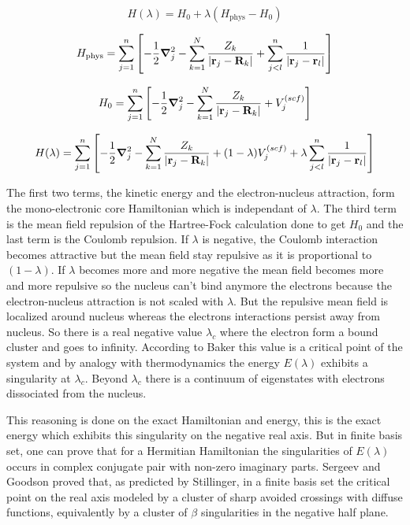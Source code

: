 \documentclass[11pt,a4paper]{article}
\begin{document}
\begin{equation}
H(\lambda)=H_0 + \lambda (H_\text{phys} - H_0)    
\end{equation}

\begin{equation}
    H_\text{phys}=\sum\limits_{j=1}^{n}\left[ -\frac{1}{2}\grad_j^2 - \sum\limits_{k=1}^{N} \frac{Z_k}{|\vb{r}_j-\vb{R}_k|}+\sum\limits_{j<l}^{n}\frac{1}{|\vb{r}_j-\vb{r}_l|}\right]
\end{equation}

\begin{equation}
    H_0=\sum\limits_{j=1}^{n}\left[ -\frac{1}{2}\grad_j^2 - \sum\limits_{k=1}^{N} \frac{Z_k}{|\vb{r}_j-\vb{R}_k|}+V_j^{(scf)}\right]
\end{equation}

\begin{equation}
    H(\lambda)=\sum\limits_{j=1}^{n}\left[-\frac{1}{2}\grad_j^2 - \sum\limits_{k=1}^{N} \frac{Z_k}{|\vb{r}_j-\vb{R}_k|} + (1-\lambda)V_j^{(scf)}+\lambda\sum\limits_{j<l}^{n}\frac{1}{|\vb{r}_j-\vb{r}_l|} \right]
\end{equation}

The first two terms, the kinetic energy and the electron-nucleus attraction, form the mono-electronic core Hamiltonian which is independant of $\lambda$. The third term is the mean field repulsion of the Hartree-Fock calculation done to get $H_0$ and the last term is the Coulomb repulsion. If $\lambda$ is negative, the Coulomb interaction becomes attractive but the mean field stay repulsive as it is proportional to $(1-\lambda)$. If $\lambda$ becomes more and more negative the mean field becomes more and more repulsive so the nucleus can't bind anymore the electrons because the electron-nucleus attraction is not scaled with $\lambda$. But the repulsive mean field is localized around nucleus whereas the electrons interactions persist away from nucleus. So there is a real negative value $\lambda_c$ where the electron form a bound cluster and goes to infinity. According to Baker this value is a critical point of the system and by analogy with thermodynamics the energy $E(\lambda)$ exhibits a singularity at $\lambda_c$. Beyond $\lambda_c$ there is a continuum of eigenstates with electrons dissociated from the nucleus.

This reasoning is done on the exact Hamiltonian and energy, this is the exact energy which exhibits this singularity on the negative real axis. But in finite basis set, one can prove that for a Hermitian Hamiltonian the singularities of $E(\lambda)$ occurs in complex conjugate pair with non-zero imaginary parts. Sergeev and Goodson proved that, as predicted by Stillinger, in a finite basis set the critical point on the real axis modeled by a cluster of sharp avoided crossings with diffuse functions, equivalently by a cluster of $\beta$ singularities in the negative half plane.
\end{document}
